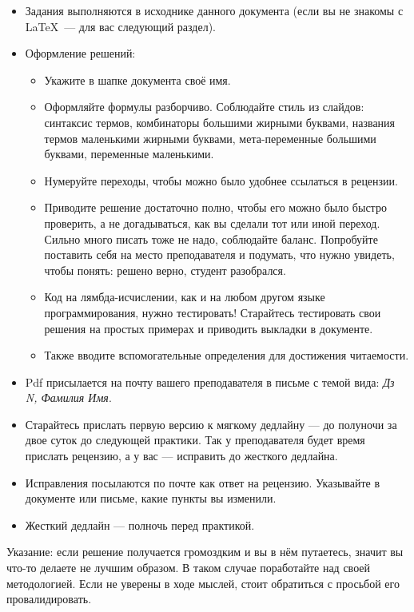 \documentclass{article}
\begin{document}
    \begin{itemize}
        \item Задания выполняются в исходнике данного документа (если вы не знакомы с \LaTeX~--- для вас следующий раздел).
        \item Оформление решений:
        \begin{itemize}
            \item Укажите в шапке документа своё имя.
            \item Оформляйте формулы разборчиво.
            Соблюдайте стиль из слайдов: синтаксис термов, комбинаторы большими жирными буквами, названия термов маленькими жирными буквами, мета-переменные большими буквами, переменные маленькими.
            \item Нумеруйте переходы, чтобы можно было удобнее ссылаться в рецензии.
            \item Приводите решение достаточно полно, чтобы его можно было быстро проверить, а не догадываться, как вы сделали тот или иной переход.
            Сильно много писать тоже не надо, соблюдайте баланс.
            Попробуйте поставить себя на место преподавателя и подумать, что нужно увидеть, чтобы понять: решено верно, студент разобрался.
            \item Код на лямбда-исчислении, как и на любом другом языке программирования, нужно тестировать!
            Старайтесь тестировать свои решения на простых примерах и приводить выкладки в документе.
            \item Также вводите вспомогательные определения для достижения читаемости.
        \end{itemize}
        \item Pdf присылается на почту вашего преподавателя в письме с темой вида: \textit{Дз N, Фамилия Имя}.
        \item Старайтесь прислать первую версию к мягкому дедлайну --- до полуночи за двое суток до следующей практики.
        Так у преподавателя будет время прислать рецензию, а у вас --- исправить до жесткого дедлайна.
        \item Исправления посылаются по почте как ответ на рецензию.
        Указывайте в документе или письме, какие пункты вы изменили.
        \item Жесткий дедлайн --- полночь перед практикой.
    \end{itemize}

    Указание: если решение получается громоздким и вы в нём путаетесь, значит вы что-то делаете не лучшим образом.
    В таком случае поработайте над своей методологией.
    Если не уверены в ходе мыслей, стоит обратиться с просьбой его провалидировать.
\end{document}
